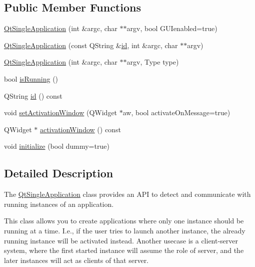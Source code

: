 \subsection*{Public Member Functions}
\begin{DoxyCompactItemize}
\item 
\hyperlink{class_qt_single_application_afe5e96d236e42949e65669eca282acbd}{Qt\+Single\+Application} (int \&argc, char $\ast$$\ast$argv, bool G\+U\+Ienabled=true)
\item 
\hyperlink{class_qt_single_application_a746192779985e28f22fd17766884518e}{Qt\+Single\+Application} (const Q\+String \&\hyperlink{class_qt_single_application_affd094410862f30fce83afcba3457b19}{id}, int \&argc, char $\ast$$\ast$argv)
\item 
\hyperlink{class_qt_single_application_adcb7a28eec3eef34c6474fb419509895}{Qt\+Single\+Application} (int \&argc, char $\ast$$\ast$argv, Type type)
\item 
bool \hyperlink{class_qt_single_application_aa9f0e6e4f18ac79bbb7a955cd860894d}{is\+Running} ()
\item 
Q\+String \hyperlink{class_qt_single_application_affd094410862f30fce83afcba3457b19}{id} () const 
\item 
void \hyperlink{class_qt_single_application_acb5347f6dc6822dbe4d6a78804043528}{set\+Activation\+Window} (Q\+Widget $\ast$aw, bool activate\+On\+Message=true)
\item 
Q\+Widget $\ast$ \hyperlink{class_qt_single_application_a1e6be5adba2282fcfe547596b2aee18a}{activation\+Window} () const 
\item 
void \hyperlink{class_qt_single_application_a622807c60657c1a1fadec15ea5903b47}{initialize} (bool dummy=true)
\end{DoxyCompactItemize}


\subsection{Detailed Description}
The \hyperlink{class_qt_single_application}{Qt\+Single\+Application} class provides an A\+PI to detect and communicate with running instances of an application. 

This class allows you to create applications where only one instance should be running at a time. I.\+e., if the user tries to launch another instance, the already running instance will be activated instead. Another usecase is a client-\/server system, where the first started instance will assume the role of server, and the later instances will act as clients of that server.

